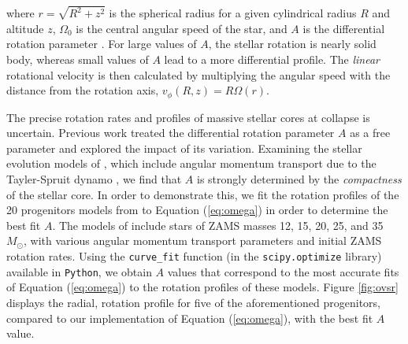 \documentclass[twocolumn,times]{aastex62}  %
\begin{document}
where $r = \sqrt{R^2 + z^2}$ is the spherical radius for a given cylindrical radius $R$ and altitude $z$, $\Omega_0$ is the central angular speed of the star, and $A$ is the differential rotation parameter \citep{eriguchi:1984}.  For large values of $A$, the stellar rotation is nearly solid body, whereas small values of $A$ lead to a more differential profile. 
The {\it linear} rotational velocity is then calculated by multiplying the angular speed with the distance from the rotation axis, $v_\phi (R, z) = R \Omega (r) $. 

The precise rotation rates and profiles of massive stellar cores at collapse is uncertain.
Previous work \citep[e.g.,][]{abdik:2014} treated the differential rotation parameter $A$ as a free parameter and explored the impact of its variation.
Examining the stellar evolution models of \citet{heger:2005}, which include angular momentum transport due to the Tayler-Spruit dynamo \citep{spruit:2002}, we find that $A$ is strongly determined by the {\it compactness} \citep{oconnor:2011} of the stellar core.
In order to demonstrate this, we fit the rotation profiles of the 20 progenitors models from \citet{heger:2005} to Equation (\ref{eq:omega}) in order to determine the best fit $A$.
The models of \citet{heger:2005} include stars of ZAMS masses 12, 15, 20, 25, and 35 $M_{\odot}$, with various angular momentum transport parameters and initial ZAMS rotation rates.  
Using the \texttt{curve\_fit} function (in the \texttt{scipy.optimize} library) available in \texttt{Python}, we obtain $A$ values that correspond to the most accurate fits of Equation (\ref{eq:omega}) to the rotation profiles of these models.  Figure \ref{fig:ovsr} displays the radial, rotation profile for five of the aforementioned progenitors, compared to our implementation of Equation (\ref{eq:omega}), with the best fit $A$ value.
\end{document}
